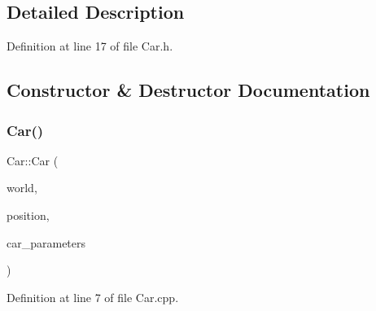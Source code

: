 \subsection{Detailed Description}


Definition at line 17 of file Car.\+h.



\subsection{Constructor \& Destructor Documentation}
\mbox{\label{classCar_aedf13bf38dd3f77f92db6ea7f4ebab6b}} 
\subsubsection{\texorpdfstring{Car()}{Car()}}
{\footnotesize\ttfamily Car\+::\+Car (\begin{DoxyParamCaption}\item[{b2\+World \&}]{world,  }\item[{const b2\+Vec2 \&}]{position,  }\item[{const \hyperlink{classCarParameters}{Car\+Parameters} \&}]{car\+\_\+parameters }\end{DoxyParamCaption})}



Definition at line 7 of file Car.\+cpp.


